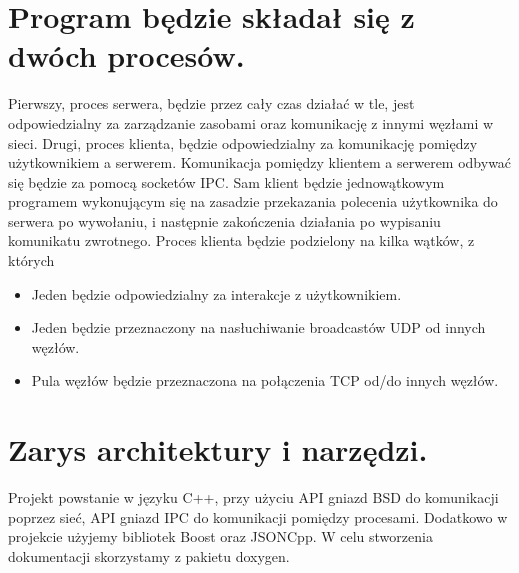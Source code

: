 \documentclass[10pt,a4paper]{article}
\begin{document}
\section{Program będzie składał się z dwóch procesów.}
Pierwszy, proces serwera, będzie przez cały czas działać w tle, jest odpowiedzialny za zarządzanie zasobami oraz komunikację z innymi węzłami w sieci.
Drugi, proces klienta, będzie odpowiedzialny za komunikację pomiędzy użytkownikiem a serwerem. Komunikacja pomiędzy klientem a serwerem odbywać się będzie za pomocą socketów IPC. Sam klient będzie jednowątkowym programem wykonującym się na zasadzie przekazania polecenia użytkownika do serwera po wywołaniu, i następnie zakończenia działania po wypisaniu komunikatu zwrotnego.
Proces klienta będzie podzielony na kilka wątków, z których
\begin{itemize}
\item Jeden będzie odpowiedzialny za interakcje z użytkownikiem.
\item Jeden będzie przeznaczony na nasłuchiwanie broadcastów UDP od innych węzłów.
\item Pula węzłów będzie przeznaczona na połączenia TCP od/do innych węzłów.
\end{itemize}
\section{ Zarys architektury i narzędzi.}
Projekt powstanie w języku C++, przy użyciu API gniazd BSD do komunikacji poprzez sieć, API gniazd IPC do komunikacji pomiędzy procesami. Dodatkowo w projekcie użyjemy bibliotek Boost oraz JSONCpp. W celu stworzenia dokumentacji skorzystamy z pakietu doxygen.
\end{document}
